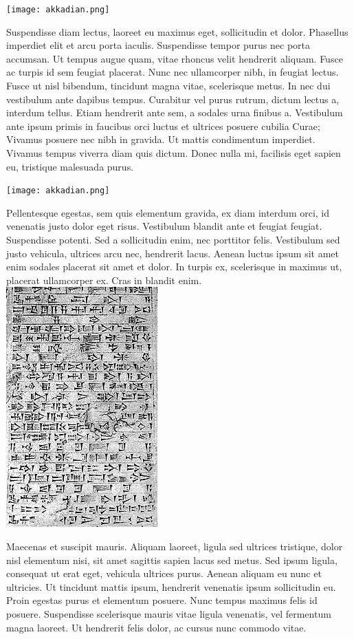 \documentclass{scrartcl}
\begin{document}
\texttt{[image: akkadian.png]}

   
   Suspendisse diam lectus, laoreet eu maximus eget, sollicitudin et dolor. Phasellus imperdiet elit et arcu porta iaculis. Suspendisse tempor purus nec porta accumsan. Ut tempus augue quam, vitae rhoncus velit hendrerit aliquam. Fusce ac turpis id sem feugiat placerat. Nunc nec ullamcorper nibh, in feugiat lectus. Fusce ut nisl bibendum, tincidunt magna vitae, scelerisque metus. In nec dui vestibulum ante dapibus tempus. Curabitur vel purus rutrum, dictum lectus a, interdum tellus. Etiam hendrerit ante sem, a sodales urna finibus a. Vestibulum ante ipsum primis in faucibus orci luctus et ultrices posuere cubilia Curae; Vivamus posuere nec nibh in gravida. Ut mattis condimentum imperdiet. Vivamus tempus viverra diam quis dictum. Donec nulla mi, facilisis eget sapien eu, tristique malesuada purus. 
   
\texttt{[image: akkadian.png]}

Pellentesque egestas, sem quis elementum gravida, ex diam interdum orci, id venenatis justo dolor eget risus. Vestibulum blandit ante et feugiat feugiat. Suspendisse potenti. Sed a sollicitudin enim, nec porttitor felis. Vestibulum sed justo vehicula, ultrices arcu nec, hendrerit lacus. Aenean luctus ipsum sit amet enim sodales placerat sit amet et dolor. In turpis ex, scelerisque in maximus ut, placerat ullamcorper ex. Cras in blandit enim. 
\includegraphics[height=.3\textheight]{tablet.jpg}


Maecenas et suscipit mauris. Aliquam laoreet, ligula sed ultrices tristique, dolor nisl elementum nisi, sit amet sagittis sapien lacus sed metus. Sed ipsum ligula, consequat ut erat eget, vehicula ultrices purus. Aenean aliquam eu nunc et ultricies. Ut tincidunt mattis ipsum, hendrerit venenatis ipsum sollicitudin eu. Proin egestas purus et elementum posuere. Nunc tempus maximus felis id posuere. Suspendisse scelerisque mauris vitae ligula venenatis, vel fermentum magna laoreet. Ut hendrerit felis dolor, ac cursus nunc commodo vitae.
\end{document}
